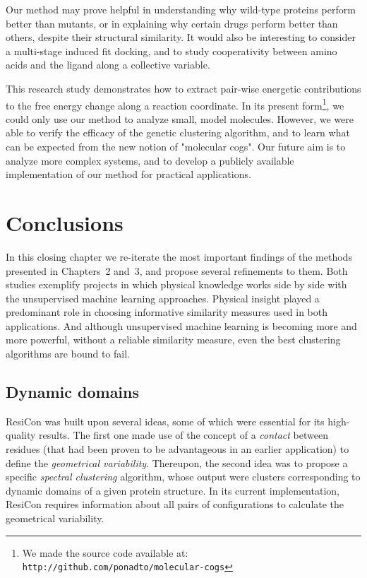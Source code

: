 \documentclass[a4paper,11pt,twoside]{book}%
\begin{document}
Our method may prove helpful in understanding why wild-type proteins perform better than mutants, or in explaining why certain drugs perform better than others, despite their structural similarity.
It would also be interesting to consider a multi-stage induced fit docking, and to study cooperativity between amino acids and the ligand along a collective variable.

This research study demonstrates how to extract pair-wise energetic contributions to the free energy change along a reaction coordinate.
In its present form\footnote{We made the source code available at: \texttt{http://github.com/ponadto/molecular-cogs}}, we could only use our method to analyze small, {\color{black}model} molecules.
However, {\color{black}we were able} to verify the efficacy of the genetic clustering algorithm, and to learn what can be expected from the new notion of "molecular cogs".
Our future aim is to analyze more complex systems, and to develop a publicly available implementation of our method for practical applications.




\chapter{Conclusions}

In this closing chapter we re-iterate the most important findings of the methods presented in Chapters~2 and~3, and propose several refinements to them.
Both studies exemplify projects in which physical knowledge works side by side with the unsupervised machine learning approaches.
Physical insight played a predominant role in choosing informative similarity measures used in both applications.
And although unsupervised machine learning is becoming more and more powerful, without a reliable similarity measure, even the best clustering algorithms are bound to fail.

\section{Dynamic domains}

ResiCon was built upon several ideas, some of which were essential for its high-quality results.
The first one made use of the concept of a \emph{contact} between residues (that had been proven to be advantageous in an earlier application) to define the \emph{geometrical variability}.
Thereupon, the second idea was to propose a specific \emph{spectral clustering} algorithm, whose output were clusters corresponding to dynamic domains of a given protein structure.
In its current implementation, ResiCon requires information about all pairs of configurations to calculate the geometrical variability. 
\end{document}
